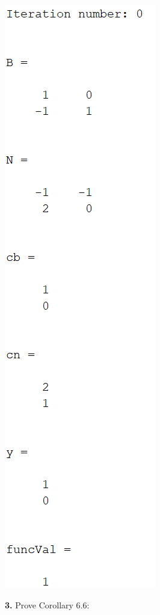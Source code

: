 \documentclass{article}
\begin{document}
\begin{center}
    \includegraphics[scale = 0.6]{optimalBasis}
\end{center}
\textbf{3.} Prove Corollary 6.6:
\newline
\end{document}
